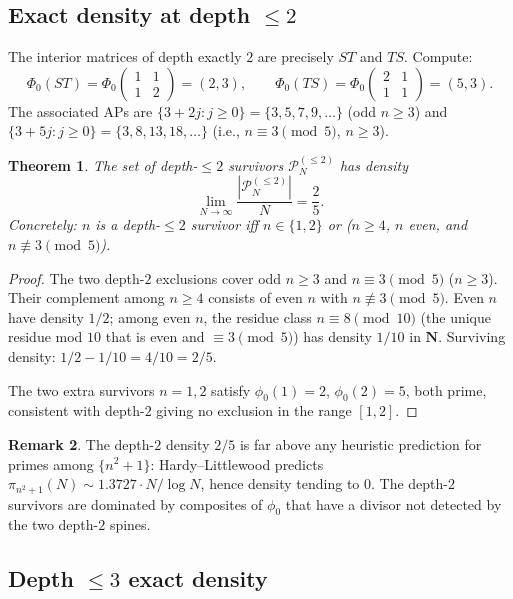 \documentclass[11pt]{article}
\newtheorem{theorem}{Theorem}[section]
\theoremstyle{definition}
\newtheorem{remark}[theorem]{Remark}
\newcommand{\N}{\mathbf{N}}
\newcommand{\Phzero}{\Phi_0}
\begin{document}
\subsection{Exact density at depth $\le 2$}

The interior matrices of depth exactly $2$ are precisely $ST$ and $TS$. Compute:
\[
\Phzero(ST) = \Phzero\!\!\begin{pmatrix}1&1\\1&2\end{pmatrix} = (2, 3), \qquad \Phzero(TS) = \Phzero\!\!\begin{pmatrix}2&1\\1&1\end{pmatrix} = (5, 3).
\]
The associated APs are $\{3+2j : j \ge 0\} = \{3,5,7,9,\dots\}$ (odd $n \ge 3$) and $\{3+5j : j \ge 0\} = \{3,8,13,18,\dots\}$ (i.e., $n \equiv 3 \pmod 5$, $n \ge 3$).

\begin{theorem}\label{thm:depth2-density}
The set of depth-$\le 2$ survivors $\mathcal{P}^{(\le 2)}_N$ has density
\[
\lim_{N \to \infty} \frac{|\mathcal{P}^{(\le 2)}_N|}{N} = \frac{2}{5}.
\]
Concretely: $n$ is a depth-$\le 2$ survivor iff $n \in \{1, 2\}$ or ($n \ge 4$, $n$ even, and $n \not\equiv 3 \pmod 5$).
\end{theorem}

\begin{proof}
The two depth-$2$ exclusions cover odd $n \ge 3$ and $n \equiv 3 \pmod 5$ ($n \ge 3$). Their complement among $n \ge 4$ consists of even $n$ with $n \not\equiv 3 \pmod 5$. Even $n$ have density $1/2$; among even $n$, the residue class $n \equiv 8 \pmod{10}$ (the unique residue mod $10$ that is even and $\equiv 3 \pmod 5$) has density $1/10$ in $\N$. Surviving density: $1/2 - 1/10 = 4/10 = 2/5$.

The two extra survivors $n=1,2$ satisfy $\phi_0(1)=2$, $\phi_0(2)=5$, both prime, consistent with depth-$2$ giving no exclusion in the range $[1,2]$.
\end{proof}

\begin{remark}
The depth-$2$ density $2/5$ is far above any heuristic prediction for primes among $\{n^2+1\}$: Hardy--Littlewood predicts $\pi_{n^2+1}(N) \sim 1.3727 \cdot N/\log N$, hence density tending to $0$. The depth-$2$ survivors are dominated by composites of $\phi_0$ that have a divisor not detected by the two depth-$2$ spines.
\end{remark}

\subsection{Depth $\le 3$ exact density}
\end{document}
